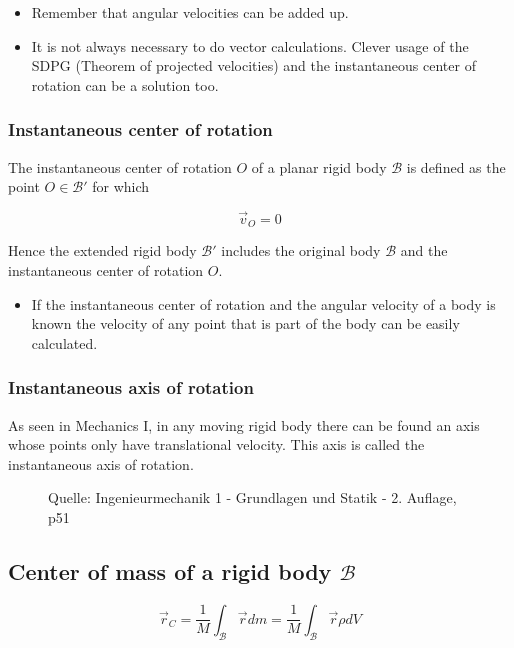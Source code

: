 \documentclass[10pt,a4paper]{scrartcl}
\begin{document}
\begin{multicols*}{2}
\begin{itemize}
\item Remember that angular velocities can be added up.
\item It is not always necessary to do vector calculations. Clever usage of the SDPG (Theorem of projected velocities) and the instantaneous center of rotation can be a solution too.
\end{itemize}

\subsubsection{Instantaneous center of rotation}

The instantaneous center of rotation $O$ of a planar rigid body $\mathcal{B}$ is defined as the point $O\in\mathcal{B}'$ for which

\begin{equation*}
\vec{v}_O=0
\end{equation*}

Hence the extended rigid body $\mathcal{B}'$ includes the original body $\mathcal{B}$ and the instantaneous center of rotation $O$.

\begin{itemize}
\item If the instantaneous center of rotation and the angular velocity of a body is known the velocity of any point that is part of the body can be easily calculated.
\end{itemize}

\subsubsection{Instantaneous axis of rotation}

As seen in Mechanics I, in any moving rigid body there can be found an axis whose points only have translational velocity. This axis is called the instantaneous axis of rotation.

\begin{figure}[h]
\caption{Quelle: Ingenieurmechanik 1 - Grundlagen und Statik - 2. Auflage, p51}
\end{figure}

\subsection{Center of mass of a rigid body $\mathcal{B}$}

\begin{equation*}
\vec{r}_C=\frac{1}{M}\int_\mathcal{B}\vec{r}dm=\frac{1}{M}\int_\mathcal{B}\vec{r}\rho dV
\end{equation*}


\end{multicols*}
\end{document}
